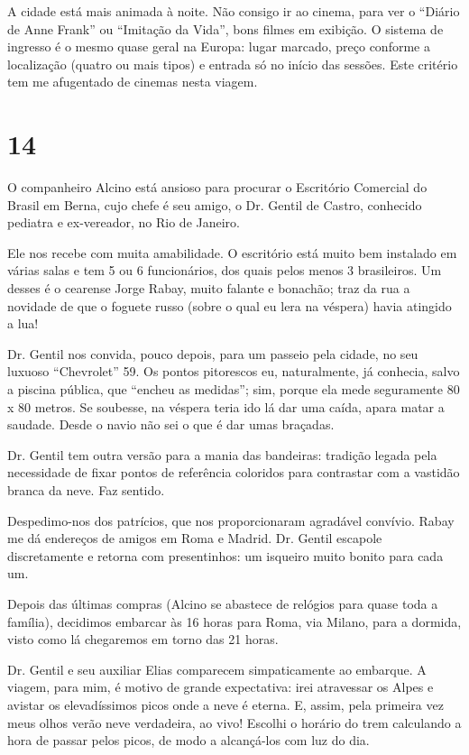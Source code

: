 A cidade está mais animada à noite. Não consigo ir ao cinema, para ver o “Diário de Anne Frank” ou “Imitação da Vida”, bons filmes em exibição. O sistema de ingresso é o mesmo quase geral na Europa: lugar marcado, preço conforme a localização (quatro ou mais tipos) e entrada só no início das sessões. Este critério tem me afugentado de cinemas nesta viagem.

\section*{14 \adfflatleafright {}}
O companheiro Alcino está ansioso para procurar o Escritório Comercial do Brasil em Berna, cujo chefe é seu amigo, o Dr. Gentil de Castro, conhecido pediatra e ex-vereador, no Rio de Janeiro.

Ele nos recebe com muita amabilidade. O escritório está muito bem instalado em várias salas e tem 5 ou 6 funcionários, dos quais pelos menos 3 brasileiros. Um desses é o cearense Jorge Rabay, muito falante e bonachão; traz da rua a novidade de que o foguete russo (sobre o qual eu lera na véspera) havia atingido a lua!

Dr. Gentil nos convida, pouco depois, para um passeio pela cidade, no seu luxuoso “Chevrolet” 59. Os pontos pitorescos eu, naturalmente, já conhecia, salvo a piscina pública, que “encheu as medidas”; sim, porque ela mede seguramente 80 x 80 metros. Se soubesse, na véspera teria ido lá dar uma caída, apara matar a saudade. Desde o navio não sei o que é dar umas braçadas.

Dr. Gentil tem outra versão para a mania das bandeiras: tradição legada pela necessidade de fixar pontos de referência coloridos para contrastar com a vastidão branca da neve. Faz sentido.

Despedimo-nos dos patrícios, que nos proporcionaram agradável convívio. Rabay me dá endereços de amigos em Roma e Madrid. Dr. Gentil escapole discretamente e retorna com presentinhos: um isqueiro muito bonito para cada um.

Depois das últimas compras (Alcino se abastece de relógios para quase toda a família), decidimos embarcar às 16 horas para Roma, via Milano, para a dormida, visto como lá chegaremos em torno das 21 horas.

Dr. Gentil e seu auxiliar Elias comparecem simpaticamente ao embarque. A viagem, para mim, é motivo de grande expectativa: irei atravessar os Alpes e avistar os elevadíssimos picos onde a neve é eterna. E, assim, pela primeira vez meus olhos verão neve verdadeira, ao vivo! Escolhi o horário do trem calculando a hora de passar pelos picos, de modo a alcançá-los com luz do dia.

